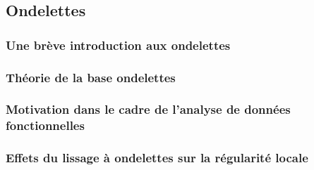 

\subsection{Ondelettes}
\subsubsection{Une brève introduction aux ondelettes}



\subsubsection{Théorie de la base ondelettes}




\subsubsection{Motivation dans le cadre de l'analyse de données fonctionnelles}

\subsubsection{Effets du lissage à ondelettes sur la régularité locale}
